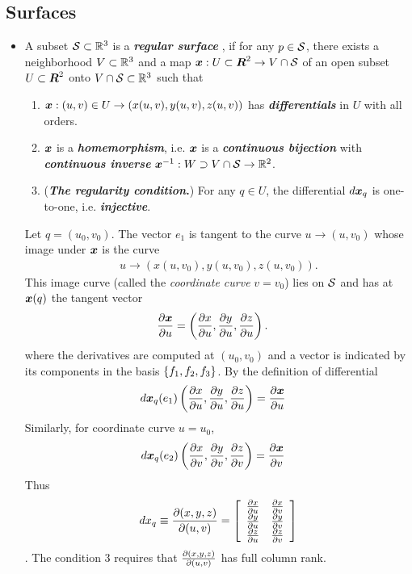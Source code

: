 \documentclass[11pt]{article}
\begin{document}
\subsection{Surfaces}
\begin{itemize}
\item
\begin{definition}
 A subset ${\mathcal S} \subset {\mathbb R}^{3}$ is a \emph{\textbf{regular surface}} \citep{do1976differential}, if for any $p\in {\mathcal S}$, there exists a neighborhood $V \subset {\mathbb R}^{3}$ and a map $\boldsymbol{x}: U \subset \boldsymbol{R}^{2} \rightarrow V\cap {\mathcal S}$ of an open subset $U\subset \boldsymbol{R}^{2}$ onto $V \cap {\mathcal S} \subset {\mathbb R}^{3}$ such that 
\begin{enumerate}
\item $\boldsymbol{x}:  (u,v) \in U \rightarrow  (x(u,v), y(u,v), z(u,v))$ has \emph{\textbf{differentials}} in $U$ with all orders. 
\item $\boldsymbol{x}$ is a \textbf{\emph{homemorphism}}, i.e. $\boldsymbol{x}$ is a \emph{\textbf{continuous bijection}} with \emph{\textbf{continuous inverse}} $\boldsymbol{x}^{-1}: W \supset V\cap {\mathcal S} \rightarrow {\mathbb R}^{2}$.
\item (\textbf{\emph{The regularity condition}.}) For any $q\in U$, the differential $d\boldsymbol{x}_{q}$ is one-to-one, i.e. \emph{\textbf{injective}}.   
\end{enumerate}   
\end{definition}

Let $q = (u_0, v_0)$. The vector $e_1$ is tangent to the curve $u \rightarrow (u, v_0)$ whose image under $\boldsymbol{x}$ is the curve
\begin{align*}
u \rightarrow (x(u, v_0), y(u, v_0), z(u, v_0)).
\end{align*} This image curve (called the \emph{coordinate curve} $v = v_0$) lies on ${\mathcal S}$ and has at $\boldsymbol{x}(q)$ the tangent vector
\begin{align*}
\frac{\partial \boldsymbol{x}}{ \partial u} &= \left(\frac{\partial x}{ \partial u}, \frac{\partial y}{ \partial u}, \frac{\partial z}{ \partial u}\right).
\end{align*} where the derivatives are computed at $(u_0,v_0)$ and a vector is indicated by its components in the basis $\left\{f_1 , f_2 , f_3 \right\}$. By the definition of differential
\begin{align*}
d\boldsymbol{x}_{q}(e_1)\left(\frac{\partial x}{ \partial u}, \frac{\partial y}{ \partial u}, \frac{\partial z}{ \partial u}\right) &= \frac{\partial \boldsymbol{x}}{ \partial u}
\end{align*} Similarly, for coordinate curve $u = u_0$, 
\begin{align*}
d\boldsymbol{x}_{q}(e_2)\left(\frac{\partial x}{ \partial v}, \frac{\partial y}{ \partial v}, \frac{\partial z}{ \partial v}\right) &= \frac{\partial \boldsymbol{x}}{ \partial v}
\end{align*}
Thus
\begin{align*}
dx_{q} \equiv \frac{\partial (x,y,z)}{ \partial (u,v)} = \left[\begin{array}{cc}
\frac{\partial x}{ \partial u} & \frac{\partial x}{ \partial v} \\
\frac{\partial y}{ \partial u} & \frac{\partial y}{ \partial v} \\
\frac{\partial z}{ \partial u} & \frac{\partial z}{ \partial v}
\end{array}\right]
\end{align*}. The condition 3 requires that $\frac{\partial (x,y,z)}{ \partial (u,v)}$ has full column rank. 


\end{itemize}
\end{document}
